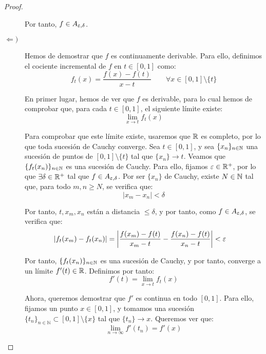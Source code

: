 \begin{ejercicio}
\begin{proof}
\begin{description}
                Por tanto, $f\in A_{\varepsilon,\delta}$.


                \item[$\Longleftarrow)$] Hemos de demostrar que $f$ es continuamente derivable. Para ello, definimos el cociente incremental de $f$ en $t\in [0,1]$ como:
                \begin{equation*}
                    f_t(x) = \frac{f(x)-f(t)}{x-t} \qquad \forall x\in [0,1]\setminus\{t\}
                \end{equation*}

                En primer lugar, hemos de ver que $f$ es derivable, para lo cual hemos de comprobar que, para cada $t\in [0,1]$, el siguiente límite existe:
                \begin{equation*}
                    \lim_{x\to t} f_t(x)
                \end{equation*}

                Para comprobar que este límite existe, usaremos que $\mathbb{R}$ es completo, por lo que toda sucesión de Cauchy converge. Sea $t\in [0,1]$, y sea $\{x_n\}_{n\in \mathbb{N}}$ una sucesión de puntos de $[0,1]\setminus\{t\}$ tal que $\{x_n\}\to t$. Veamos que $\{f_t(x_n)\}_{n\in \mathbb{N}}$ es una sucesión de Cauchy. Para ello, fijamos $\varepsilon\in \mathbb{R}^+$, por lo que $\exists \delta\in \mathbb{R}^+$ tal que $f\in A_{\varepsilon,\delta}$. Por ser $\{x_n\}$ de Cauchy, existe $N\in \mathbb{N}$ tal que, para todo $m,n\geq N$, se verifica que:
                \begin{equation*}
                    |x_m-x_n| < \delta
                \end{equation*}

                Por tanto, $t,x_m,x_n$ están a distancia $\leq \delta$, y por tanto, como $f\in A_{\varepsilon,\delta}$, se verifica que:
                \begin{align*}
                    \left|f_t(x_m) - f_t(x_n)\right| &= \left|\frac{f(x_m)-f(t)}{x_m-t} - \frac{f(x_n)-f(t)}{x_n-t}\right|< \varepsilon
                \end{align*}

                Por tanto, $\{f_t(x_n)\}_{n\in \mathbb{N}}$ es una sucesión de Cauchy, y por tanto, converge a un límite $f'(t)\in \mathbb{R}$. Definimos por tanto:
                \begin{equation*}
                    f'(t) = \lim_{x\to t} f_t(x)
                \end{equation*}

                Ahora, queremos demostrar que \( f' \) es continua en todo \( [0,1] \). Para ello, fijamos un punto \( x \in [0,1] \), y tomamos una sucesión \( \{t_n\}_{n \in \mathbb{N}} \subset [0,1] \setminus \{x\} \) tal que \( \{t_n\} \to x \). Queremos ver que:
                \[
                \lim_{n \to \infty} f'(t_n) = f'(x)
                \]


\end{description}
\end{proof}
\end{ejercicio}
